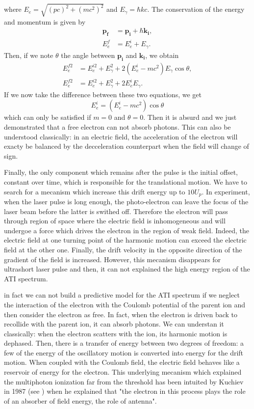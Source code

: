 \documentclass[a4paper]{article}
\begin{document}
where $E_{e}=\sqrt{(pc)^{2}+(mc^{2})^{2}}$ and $E_{\gamma}=\hbar kc$.
The conservation of the energy and momentum is given by
\begin{align}
\label{momentum_conservation}
\mathbf{p_{f}}&=\mathbf{p_{i}}+\hbar \mathbf{k_{i}}, \\
\label{energy_conservation}
E_{e}^{f}&=E_{e}^{i}+E_{\gamma}.
\end{align}
Then, if we note $\theta$ the angle between $\mathbf{p_{i}}$ and $\mathbf{k_{i}}$, we obtain
\begin{align}
E_{e}^{f2}&=E_{e}^{i2}+E_{\gamma}^{2}+2(E_{e}^{i}-mc^{2})E_{\gamma}\cos{\theta}, \\
E_{e}^{f2}&=E_{e}^{i2}+E_{\gamma}^{2}+2 E_{e}^{i}E_{\gamma}.
\end{align}
If we now take the difference between these two equations, we get
\begin{equation}
E_{e}^{i}=(E_{e}^{i}-mc^{2})\cos{\theta}
\end{equation}
which can only be satisfied if $m=0$ and $\theta=0$. Then it is absurd and we just demonstrated that a free electron can not absorb photons.
This can also be understood classically: in an electric field, the acceleration of the electron will exacty be balanced by the decceleration counterpart when the field will change of sign.
\par
Finally, the only component which remains after the pulse is the initial offset, constant over time, which is responsible for the translational motion. We have to search for a mecanism which increase this drift energy up to $10 U_{p}$.
In experiment, when the laser pulse is long enough, the photo-electron can leave the focus of the laser beam before the latter is swithed off. Therefore the electron will pass through region of space where the electric field is inhomogeneous and will undergoe a force which drives the electron in the region of weak field. Indeed, the electric field at one turning point of the harmonic motion can exceed the electric field at the other one. Finally, the drift velocity in the opposite direction of the gradient of the field is increased. However, this mecanism disappears for ultrashort laser pulse and then, it can not explained the high energy region of the ATI spectrum.
\par
in fact we can not build a predictive model for the ATI spectrum if we neglect the interaction of the electron with the Coulomb potential of the parent ion and then consider the electron as free. In fact, when the electron is driven back to recollide with the parent ion, it can absorb photons. We can understan it classically: when the electron scatters with the ion, its harmonic motion is dephased. Then, there is a transfer of energy between two degrees of freedom: a few of the energy of the oscillatory motion is converted into energy for the drift motion. When coupled with the Coulomb field, the electric field behaves like a reservoir of energy for the electron. This underlying mecanism which explained the multiphoton ionization far from the threshold has been intuited by Kuchiev in 1987 (see \cite{Kuchiev_1987}) when he explained that "the electron in this process plays the role of an absorber of field energy, the role of antenna".
\end{document}

